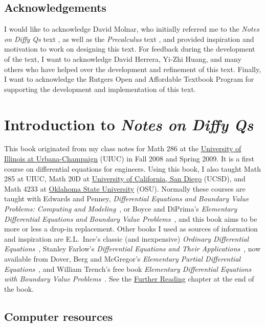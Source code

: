 \documentclass{ximera}
\begin{document}
\subsection*{Acknowledgements}

I would like to acknowledge David Molnar, who initially referred me to the \emph{Notes on Diffy Qs} text \cite{JL}, as well as the \emph{Precalculus} text \cite{SZ}, and provided inspiration and motivation to work on designing this text. For feedback during the development of the text, I want to acknowledge David Herrera, Yi-Zhi Huang, and many others who have helped over the development and refinement of this text. Finally, I want to acknowledge the Rutgers Open and Affordable Textbook Program for supporting the development and implementation of this text.  


\section*{Introduction to \emph{Notes on Diffy Qs}}

This book \cite{JL} originated from my class notes for Math 286 at the \href{https://www.math.uiuc.edu/}{University of Illinois at Urbana-Champaign} (UIUC) in Fall 2008 and Spring 2009. It is a first course on differential equations for engineers. Using this book, I also taught Math 285 at UIUC\@, Math 20D at \href{https://www.math.ucsd.edu/}{University of California, San Diego} (UCSD), and Math 4233 at \href{https://math.okstate.edu/}{Oklahoma State University} (OSU). Normally these courses are taught with Edwards and Penney, \emph{Differential Equations and Boundary Value Problems: Computing and Modeling}~\cite{EP}, or Boyce and DiPrima's \emph{Elementary Differential Equations and Boundary Value Problems}~\cite{BD}, and this book aims to be more or less a drop-in replacement. Other books I used as sources of information and inspiration are E.L.\ Ince's classic (and inexpensive) \emph{Ordinary Differential Equations}~\cite{I}, Stanley Farlow's \emph{Differential Equations and Their Applications}~\cite{F}, now available from Dover, Berg and McGregor's \emph{Elementary Partial Differential Equations}~\cite{BM}, and William Trench's free book \emph{Elementary Differential Equations with Boundary Value Problems}~\cite{T}. See the \hyperref[furtherreading:chapter]{Further Reading} chapter at the end of the book.


\subsection*{Computer resources}
\end{document}
